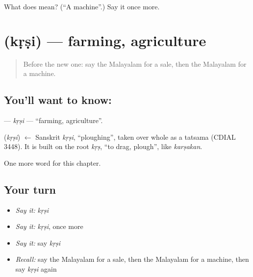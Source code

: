 \begin{tcolorbox}[breakable,colback=teal!4,colframe=teal!35!black,title={Before you move on}]
What does  mean? (\textquotedblleft{}A machine\textquotedblright{}.) Say it once more.
\end{tcolorbox}
\section[\texorpdfstring{\ml{കൃഷി} (kṛṣi)}{കൃഷി (kṛṣi)}]{ (kṛṣi) — farming, agriculture}

\label{lesson:ML-C336-krsi}



\begin{quote}
Before the new one: say the Malayalam for a sale, then the Malayalam for a machine.
\end{quote}

\subsection*{You'll want to know: }
\textbf{} — \emph{kṛṣi} — \textquotedblleft{}farming, agriculture\textquotedblright{}.

\begin{cousinweb}
\textbf{} (\emph{kṛṣi}) $\leftarrow$ Sanskrit \emph{kṛṣi}, \textquotedblleft{}ploughing\textquotedblright{}, taken over whole as a tatsama (CDIAL 3448). It is built on the root \emph{kṛṣ}, \textquotedblleft{}to drag, plough\textquotedblright{}, like \emph{karṣakan}.
\end{cousinweb}

\begin{grammarlens}[title={What you've built}]
One more word for this chapter.
\end{grammarlens}

\subsection*{Your turn}
\begin{itemize}
\raggedright
  \item \emph{Say it:} \emph{kṛṣi}
  \item \emph{Say it:} \emph{kṛṣi}, once more
  \item \emph{Say it:} say \emph{kṛṣi}
  \item \emph{Recall:} say the Malayalam for a sale, then the Malayalam for a machine, then say \emph{kṛṣi} again
\end{itemize}

